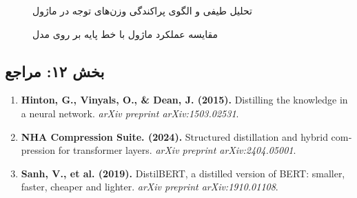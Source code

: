 \begin{figure}[H]
\centering
{}
\caption{تحلیل طیفی و الگوی پراکندگی وزن‌های توجه در ماژول }
\label{fig:spectral_nha_compressor}
\end{figure}

\begin{figure}[H]
\centering
{}
\caption{مقایسه عملکرد ماژول  با خط پایه بر روی مدل }
\label{fig:bar_nha_compressor}
\end{figure}

\subsection*{بخش ۱۲: مراجع }
\begin{latin}
\begin{enumerate}
    \item \textbf{Hinton, G., Vinyals, O., \& Dean, J. (2015).} Distilling the knowledge in a neural network. \textit{arXiv preprint arXiv:1503.02531}.
    \item \textbf{NHA Compression Suite. (2024).} Structured distillation and hybrid compression for transformer layers. \textit{arXiv preprint arXiv:2404.05001}.
    \item \textbf{Sanh, V., et al. (2019).} DistilBERT, a distilled version of BERT: smaller, faster, cheaper and lighter. \textit{arXiv preprint arXiv:1910.01108}.
\end{enumerate}
\end{latin}
